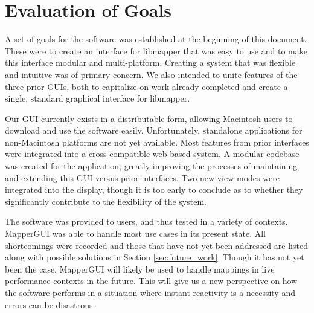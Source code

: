 \section{Evaluation of Goals} %
\label{sec:evaluation_of_goals}

A set of goals for the software was established at the beginning of this document. These were to create an interface for libmapper that was easy to use and to make this interface modular and multi-platform. Creating a system that was flexible and intuitive was of primary concern. We also intended to unite features of the three prior GUIs, both to capitalize on work already completed and create a single, standard graphical interface for libmapper. 

Our GUI currently exists in a distributable form, allowing Macintosh users to download and use the software easily. Unfortunately, standalone applications for non-Macintosh platforms are not yet available. Most features from prior interfaces were integrated into a cross-compatible web-based system. A modular codebase was created for the application, greatly improving the processes of maintaining and extending this GUI versus prior interfaces. Two new view modes were integrated into the display, though it is too early to conclude as to whether they significantly contribute to the flexibility of the system.

The software was provided to users, and thus tested in a variety of contexts. MapperGUI was able to handle most use cases in its present state. All shortcomings were recorded and those that have not yet been addressed are listed along with possible solutions in Section \ref{sec:future_work}. Though it has not yet been the case, MapperGUI will likely be used to handle mappings in live performance contexts in the future. This will give us a new perspective on how the software performs in a situation where instant reactivity is a necessity and errors can be disastrous. 
	




